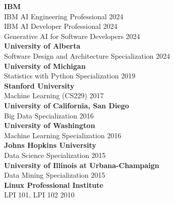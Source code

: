 \documentclass[a4paper]{article}
\begin{document}
\vspace{1mm}
\textbf{IBM}                          \hfill      \\
IBM AI Engineering Professional       \hfill 2024 \\
IBM AI Developer 
Professional         \hfill 2024 \\
Generative AI for Software Developers \hfill 2024 \\

\vspace{1mm}
\textbf{University of Alberta}                  \hfill      \\
Software Design and Architecture Specialization \hfill 2024 \\

\vspace{1mm}
\textbf{University of Michigan}       \hfill      \\
Statistics with Python Specialization \hfill 2019 \\

\vspace{1.0mm}
\textbf{Stanford University} \hfill      \\
Machine Learning (CS229)     \hfill 2017 \\

\vspace{1.0mm}
\textbf{University of California, San Diego}\hfill \\
Big Data Specialization \hfill 2016 \\

\vspace{1.0mm}
\textbf{University 
of Washington}\hfill \\
Machine Learning Specialization \hfill 2016 \\

\vspace{1.0mm}
\textbf{Johns Hopkins University}\hfill \\
Data Science Specialization \hfill 2015 \\

\vspace{1.0mm}
\textbf{University of Illinois at Urbana-Champaign} \hfill      \\
Data Mining Specialization                          \hfill 2015 \\

\vspace{1.0mm}
\textbf{Linux Professional Institute} \hfill      \\
LPI 101, LPI 102                      \hfill 2010 \\
\end{document}
